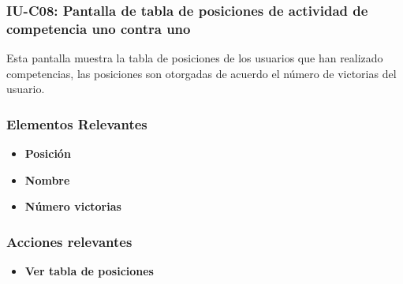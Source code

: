 
\subsubsection{IU-C08: Pantalla de tabla de posiciones de actividad de competencia uno contra uno}

 Esta pantalla muestra la tabla de posiciones de los usuarios que han realizado competencias, las posiciones son otorgadas de acuerdo el número de victorias del usuario.


\subsubsection{Elementos Relevantes}

    \begin{itemize}
    \item {\bf Posición}
    \item {\bf Nombre}
    \item {\bf Número victorias}
    \end{itemize}

\subsubsection{Acciones relevantes}

    \begin{itemize}
    \item {\bf Ver tabla de posiciones}

    \end{itemize}

\clearpage
